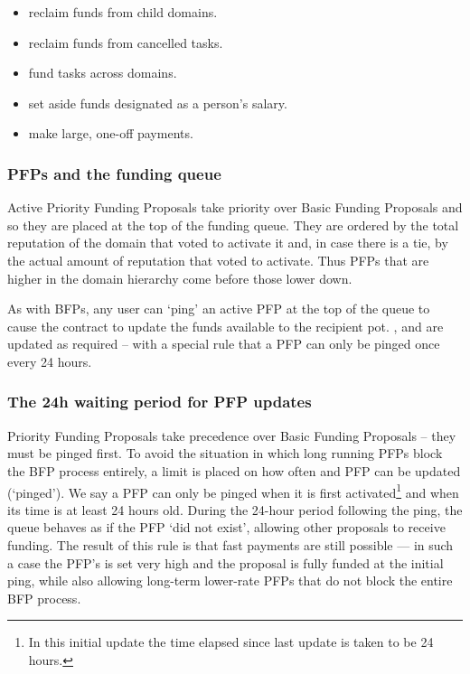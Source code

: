 \begin{itemize}
 \item reclaim funds from child domains.
 \item reclaim funds from cancelled tasks.
 \item fund tasks across domains.
 \item set aside funds designated as a person's salary.
 \item make large, one-off payments.
 \end{itemize}

\subsubsection*{PFPs and the funding queue}
Active Priority Funding Proposals take priority over Basic Funding Proposals and so they are placed at the top of the funding queue. They are ordered by the total reputation of the domain that voted to activate it and, in case there is a tie, by the actual amount of reputation that voted to activate. Thus PFPs that are higher in the domain hierarchy come before those lower down.

As with BFPs, any user can `ping' an active PFP at the top of the queue to cause the contract to update the funds available to the recipient pot. ,  and  are updated as required -- with a special rule that a PFP can only be pinged once every 24 hours.

\subsubsection*{The 24h waiting period for PFP updates}
Priority Funding Proposals take precedence over Basic Funding Proposals -- they must be pinged first. To avoid the situation in which long running PFPs block the BFP process entirely, a limit is placed on how often and PFP can be updated (`pinged'). We say a PFP can only be pinged when it is first activated\footnote{In this initial update the time elapsed since last update is taken to be 24 hours.} and when its  time is at least 24 hours old. During the 24-hour period following the ping, the queue behaves as if the PFP `did not exist', allowing other proposals to receive funding. The result of this rule is that fast payments are still possible --- in such a case the PFP's  is set very high and the proposal is fully funded at the initial ping, while also allowing long-term lower-rate PFPs that do not block the entire BFP process.

